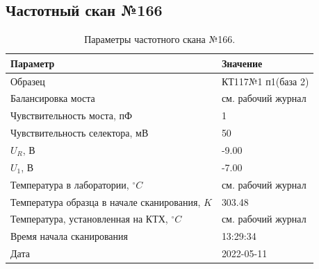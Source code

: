 \subsection{Частотный скан №166}
\begin{table}[!ht]
    \centering
    \caption{Параметры частотного скана №166.}
    \begin{tabular}{|l|l|}
        \hline
        Параметр                                       & Значение                  \\ \hline
        Образец                                        & КТ117№1 п1(база 2)        \\ \hline
        Балансировка моста                             & см. рабочий журнал        \\ \hline
        Чувствительность моста, пФ                     & 1                         \\ \hline
        Чувствительность селектора, мВ                 & 50                        \\ \hline
        $U_R$, В                                       & -9.00                     \\ \hline
        $U_1$, В                                       & -7.00                     \\ \hline
        Температура в лаборатории, $^\circ C$          & см. рабочий журнал        \\ \hline
        Температура образца в начале сканирования, $K$ & 303.48                    \\ \hline
        Температура, установленная на КТХ, $^\circ C$  & см. рабочий журнал        \\ \hline
        Время начала сканирования                      & 13:29:34                  \\ \hline
        Дата                                           & 2022-05-11                \\ \hline
    \end{tabular}
    \label{table:frequency_scan_166}
\end{table}


